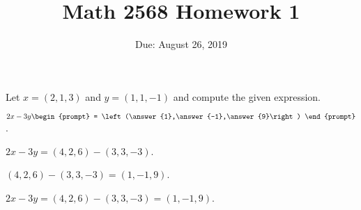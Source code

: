 \documentclass{article}
\title{Math 2568 Homework 1}
\author{\phantom{HLAH}}
\date{Due: August 26, 2019 }
\begin{document}
\maketitle


\problemlabel

\noindent Let $x=(2,1,3)$ and  $y=(1,1,-1)$ and compute the given expression.

\begin{exercise}  \label{c1.1.1B}
  $2x-3y\begin{prompt}
    = \left(\answer{1},\answer{-1},\answer{9}\right)
  \end{prompt}$.
  \begin{hint}
    $2x - 3y = (4,2,6) - (3,3,-3)$.
  \end{hint}
  \begin{hint}
    $(4,2,6) - (3,3,-3) = (1,-1,9)$.
  \end{hint}  

\begin{solution}
$2x - 3y = (4,2,6) - (3,3,-3) = (1,-1,9)$.

\end{solution}
\end{exercise}





\problemlabel
\end{document}
